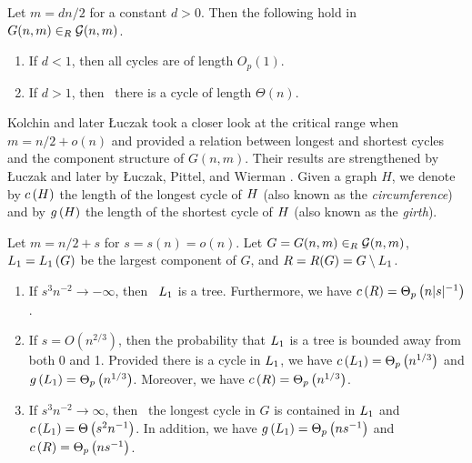 \begin{thm}\label{CBknown_0}
Let $m=dn/2$ for a constant $d>0$. Then the following hold in $G(n,m)\in_R \mathcal G(n,m)$.
\begin{enumerate}
\item
If $d<1$, then all cycles are of length $O_p(1)$.
\item
If $d>1$, then \whp\ there is a cycle of length $\Theta(n)$.
\end{enumerate}
\end{thm}
Kolchin \cite{Kolchin1986} and later {\L}uczak \cite{Luczak1990} took a closer look at the critical range when $m=n/2+o(n)$ and provided a relation between longest and shortest cycles and the component structure of $G(n,m)$. Their results are strengthened by {\L}uczak \cite{Luczak1991b} and later by {\L}uczak, Pittel, and Wierman \cite{LuczakPittelWierman1994}. Given a graph $H$, we denote by $c\left({H}\right)$ the length of the longest cycle of $H$ (also known as the {\em circumference}) and by $g\left({H}\right)$ the length of the shortest cycle of $H$ (also known as the {\em girth}).
\begin{thm}\label{CBthm:known}
Let $m=n/2+s$ for $s=s(n)=o\left(n\right)$. Let $G=G(n,m)\in_R \mathcal G(n,m)$, $L_1=L_1\left(G\right)$ be the largest component of $G$, and $R=R(G)=G\setminus L_1$.
\begin{enumerate}
\item\label{CBthm:known1}
If $s^3 n^{-2} \to -\infty$, then \whp\ $L_1$ is a tree. Furthermore, we have $c\left({R}\right)=\Theta_p\left(n|s|^{-1}\right)$.
\item\label{CBthm:known2}
If $s=O\left(n^{2/3}\right)$, then the probability that $L_1$ is a tree is bounded away from both 0 and 1. Provided there is a cycle in $L_1$, we have $c\left({L_1}\right)=\Theta_p\left(n^{1/3}\right)$ and $g\left({L_1}\right)=\Theta_p\left(n^{1/3}\right)$. Moreover, we have $c\left({R}\right)=\Theta_p\left(n^{1/3}\right)$.
\item\label{CBthm:known3} If $s^3 n^{-2} \to \infty$, then \whp\ the longest cycle in $G$ is contained in $L_1$ and $c\left({L_1}\right)=\Theta\left(s^2 n^{-1}\right)$. In addition, we have $g\left({L_1}\right)=\Theta_p\left(n s^{-1} \right)$ and $c\left({R}\right)=\Theta_p\left(n s^{-1}\right)$. 
\end{enumerate}	
\end{thm}
